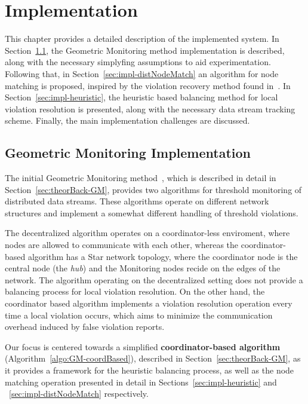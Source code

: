 \chapter{Implementation} \label{chap:impl}

This chapter provides a detailed description of the implemented system. In Section~\ref{sec:impl-GM}, the Geometric Monitoring method implementation is described, along with the necessary simplyfing assumptions to aid experimentation. Following that, in Section~\ref{sec:impl-distNodeMatch} an algorithm for node matching is proposed, inspired by the violation recovery method found in~\cite{Keren2014GMHetStreams}. In Section~\ref{sec:impl-heuristic}, the heuristic based balancing method for local violation resolution is presented, along with the necessary data stream tracking scheme. Finally, the main implementation challenges are discussed.

\section{Geometric Monitoring Implementation} \label{sec:impl-GM}

The initial Geometric Monitoring method~\cite{Sharfman2006GM}, which is described in detail in Section~\ref{sec:theorBack-GM}, provides two algorithms for threshold monitoring of distributed data streams. These algorithms operate on different network structures and implement a somewhat different handling of threshold violations.

The decentralized algorithm operates on a coordinator-less enviroment, where nodes are allowed to communicate with each other, whereas the coordinator-based algorithm has a Star network topology, where the coordinator node is the central node (the \emph{hub}) and the Monitoring nodes recide on the edges of the network.
The algorithm operating on the decentralized setting does not provide a balancing process for local violation resolution. On the other hand, the coordinator based algorithm implements a violation resolution operation every time a local violation occurs, which aims to minimize the communication overhead induced by false violation reports. 

Our focus is centered towards a simplified \textbf{coordinator-based algorithm} (Algorithm~\ref{algo:GM-coordBased}), described in Section~\ref{sec:theorBack-GM}, as it provides a framework for the heuristic balancing process, as well as the node matching operation presented in detail in Sections~\ref{sec:impl-heuristic} and ~\ref{sec:impl-distNodeMatch} respectively.

